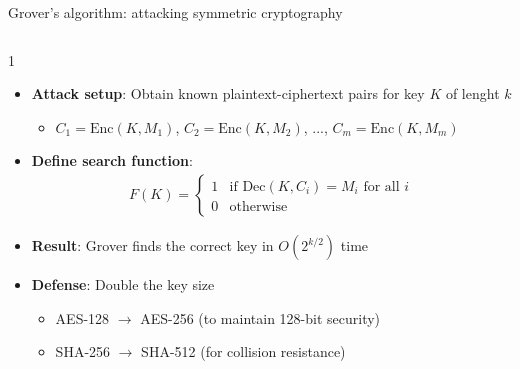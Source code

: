 \documentclass[aspectratio=169, lualatex]{beamer} %
\begin{document}
\begin{frame}{Grover's algorithm: attacking symmetric cryptography}
	\begin{columns}[c]
		\begin{column}{1\textwidth}
			\begin{itemize}
				\item \textbf{Attack setup}: Obtain known plaintext-ciphertext pairs for key $K$ of lenght $k$
				      \begin{itemize}
					      \item $C_1 = \text{Enc}(K, M_1)$, $C_2 = \text{Enc}(K, M_2)$, ..., $C_m = \text{Enc}(K, M_m)$
				      \end{itemize}
				\item \textbf{Define search function}:
				      \begin{align*}
					      F(K) = \begin{cases}
						             1 & \text{if } \text{Dec}(K, C_i) = M_i \text{ for all } i \\
						             0 & \text{otherwise}
					             \end{cases}
				      \end{align*}\pause
				\item \textbf{Result}: Grover finds the correct key in $O(2^{k/2})$ time%
				\item \textbf{Defense}: Double the key size %
				      \begin{itemize}
					      \item AES-128 $\rightarrow$ AES-256 (to maintain 128-bit security)
					      \item SHA-256 $\rightarrow$ SHA-512 (for collision resistance)
				      \end{itemize}
			\end{itemize}
		\end{column}
	\end{columns}
\end{frame}
\end{document}
